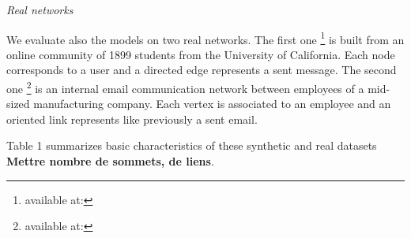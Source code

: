 \textit{Real networks}

We evaluate also the models on two  real networks.
The first one \footnote{available at:} is built from an online community of 1899 students from the University of California. Each node corresponds to a user and a directed edge represents a sent message. 
The second one \footnote{available at:} is an internal email communication network between employees of a mid-sized manufacturing company. Each vertex is associated to an employee and an oriented link represents like previously a sent email.

Table 1 summarizes basic characteristics of these synthetic and real datasets \textbf{ Mettre nombre de sommets, de liens}.







